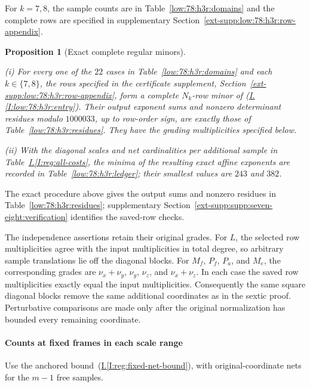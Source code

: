 \documentclass[11pt]{amsart}
\newtheorem{proposition}[theorem]{Proposition}
\theoremstyle{definition}
\theoremstyle{remark}
\numberwithin{equation}{section}
\newcommand{\partIref}[1]{\hyperref[I:#1]{I.\ref*{I:#1}}}
\newcommand{\partIeqref}[1]{\textup{(\partIref{#1})}}
\begin{document}
For $k=7,8$, the sample counts are in Table~\ref{low:78:h3r:domains} and the complete rows are specified in supplementary Section~\ref{ext-supp:low:78:h3r:row-appendix}.

\begin{proposition}[Exact complete regular minors]\label{low:78:h3r:exact-certificates}

\noindent\textup{(i)} For every one of the $22$ cases in Table~\ref{low:78:h3r:domains} and each $k\in\{7,8\}$, the rows specified in the certificate supplement, Section~\ref{ext-supp:low:78:h3r:row-appendix}, form a complete $N_k$-row minor of \partIeqref{low:78:h3r:entry}. Their output exponent sums and nonzero determinant residues modulo $1000033$, up to row-order sign, are exactly those of Table~\ref{low:78:h3r:residues}. They have the grading multiplicities specified below.

\noindent\textup{(ii)} With the diagonal scales and net cardinalities per additional sample in Table~\partIref{reg:all-costs}, the minima of the resulting exact affine exponents are recorded in Table~\ref{low:78:h3r:ledger}; their smallest values are $243$ and $382$.
\end{proposition}

The exact procedure above gives the output sums and nonzero residues in Table~\ref{low:78:h3r:residues}; supplementary Section~\ref{ext-supp:supp:seven-eight:verification} identifies the saved-row checks.

The independence assertions retain their original grades. For $L$, the selected row multiplicities agree with the input multiplicities in total degree, so arbitrary sample translations lie off the diagonal blocks. For $M_f$, $P_f$, $P_a$, and $M_e$, the corresponding grades are $\nu_x+\nu_y$, $\nu_y$, $\nu_z$, and $\nu_x+\nu_z$. In each case the saved row multiplicities exactly equal the input multiplicities. Consequently the same square diagonal blocks remove the same additional coordinates as in the sextic proof. Perturbative comparisons are made only after the original normalization has bounded every remaining coordinate.

\paragraph{Counts at fixed frames in each scale range}\label{low:78:h3r:scales}

Use the anchored bound~\partIeqref{reg:fixed-net-bound}, with original-coordinate nets for the $m-1$ free samples.
\end{document}
